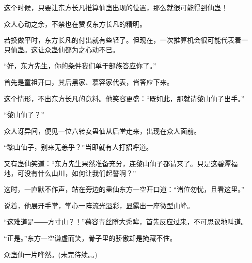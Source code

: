\begin{this_body}
这个时候，只要让东方长凡推算仙蛊出现的位置，那么就很可能得到仙蛊！

众人心动之余，不禁也在赞叹东方长凡的精明。

若换做平时，东方长凡的付出就有些轻了。但现在，一次推算机会很可能代表着一只仙蛊。这让众蛊仙都为之心动不已。

“好，东方先生，你的条件我们单于部族答应你了。”

首先是童祖开口，其后黑家、慕容家代表，皆答应下来。

这个情形，不出东方长凡的意料。他笑容更盛：“既如此，那就请黎山仙子出手。”

“黎山仙子？”

众人讶异间，便见一位六转女蛊仙从后堂走来，出现在众人面前。

“黎山仙子，别来无恙乎？”当即就有人打招呼道。

又有蛊仙笑道：“东方先生果然准备充分，连黎山仙子都请来了。只是这碧潭福地，可没有什么山川，如何让我们起誓啊？”

这时，一直默不作声，站在旁边的蛊仙东方一空开口道：“诸位勿忧，且看这里。”

说着，他展开手掌，掌心一阵流光溢彩，显露出一座微型山峰。

“这难道是――方寸山？！”慕容青丝瞪大秀眸，首先反应过来，不可思议地叫道。

“正是。”东方一空谦虚而笑，骨子里的骄傲却是掩藏不住。

众蛊仙一片哗然。(未完待续。。)

\end{this_body}

